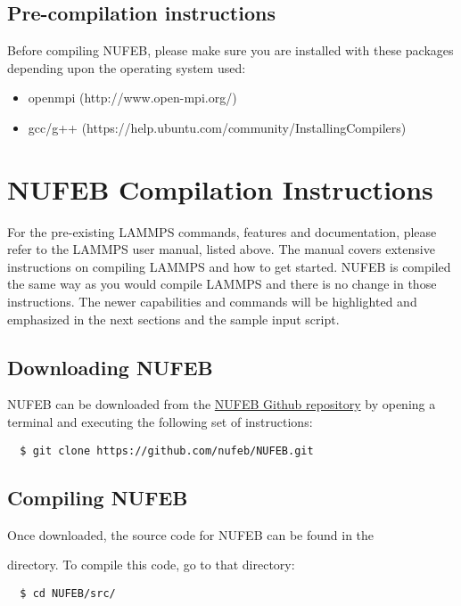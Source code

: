 \documentclass[11pt,a4paper,openright]{article}
\begin{document}
\subsection{Pre-compilation instructions}

Before compiling NUFEB, please make sure you are installed with these packages depending upon the operating system used:

\begin{itemize}
\item openmpi (http://www.open-mpi.org/)
\item gcc/g++ (https://help.ubuntu.com/community/InstallingCompilers)
\end{itemize} 

\section{NUFEB Compilation Instructions}
For the pre-existing LAMMPS commands, features and documentation, please refer to the LAMMPS user manual, listed above. The manual covers extensive instructions on compiling LAMMPS and how to get started. NUFEB is compiled the same way as you would compile LAMMPS and there is no change in those instructions. The newer capabilities and commands will be highlighted and emphasized in the next sections and the sample input script. 


\subsection{Downloading NUFEB}
NUFEB can be downloaded from the  \href{https://github.com/shelllbw/nufeb/tree/master/code}{NUFEB Github repository} by opening a terminal and executing the following set of instructions:

\begin{verbatim}
  $ git clone https://github.com/nufeb/NUFEB.git
\end{verbatim}

\subsection{Compiling NUFEB}

Once downloaded, the source code for NUFEB can be found in the 

 directory.  To compile this code, go to that directory:

\begin{verbatim}
  $ cd NUFEB/src/
\end{verbatim}
\end{document}
